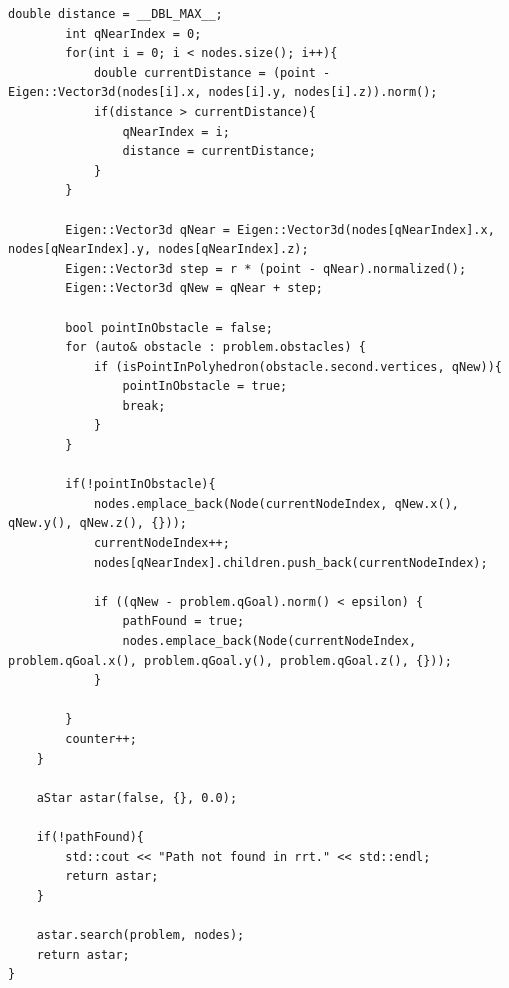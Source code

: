 \documentclass{article}
\begin{document}
\begin{lstlisting}[style=cppstyle]
        double distance = __DBL_MAX__;
        int qNearIndex = 0;
        for(int i = 0; i < nodes.size(); i++){
            double currentDistance = (point - Eigen::Vector3d(nodes[i].x, nodes[i].y, nodes[i].z)).norm();
            if(distance > currentDistance){
                qNearIndex = i;
                distance = currentDistance;
            } 
        }

        Eigen::Vector3d qNear = Eigen::Vector3d(nodes[qNearIndex].x, nodes[qNearIndex].y, nodes[qNearIndex].z);
        Eigen::Vector3d step = r * (point - qNear).normalized();
        Eigen::Vector3d qNew = qNear + step;

        bool pointInObstacle = false;
        for (auto& obstacle : problem.obstacles) {
            if (isPointInPolyhedron(obstacle.second.vertices, qNew)){
                pointInObstacle = true;
                break;
            } 
        }

        if(!pointInObstacle){
            nodes.emplace_back(Node(currentNodeIndex, qNew.x(), qNew.y(), qNew.z(), {}));
            currentNodeIndex++;
            nodes[qNearIndex].children.push_back(currentNodeIndex);

            if ((qNew - problem.qGoal).norm() < epsilon) {
                pathFound = true;
                nodes.emplace_back(Node(currentNodeIndex, problem.qGoal.x(), problem.qGoal.y(), problem.qGoal.z(), {}));
            }

        }
        counter++;
    }

    aStar astar(false, {}, 0.0);

    if(!pathFound){
        std::cout << "Path not found in rrt." << std::endl;
        return astar;
    }

    astar.search(problem, nodes);
    return astar;
}
\end{lstlisting}
\end{document}

